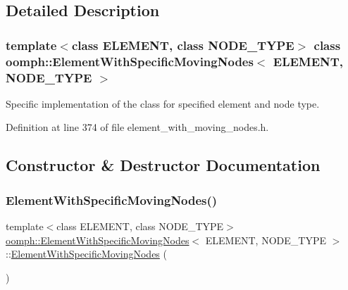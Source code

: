 \subsection{Detailed Description}
\subsubsection*{template$<$class E\+L\+E\+M\+E\+NT, class N\+O\+D\+E\+\_\+\+T\+Y\+PE$>$\newline
class oomph\+::\+Element\+With\+Specific\+Moving\+Nodes$<$ E\+L\+E\+M\+E\+N\+T, N\+O\+D\+E\+\_\+\+T\+Y\+P\+E $>$}

Specific implementation of the class for specified element and node type. 

Definition at line 374 of file element\+\_\+with\+\_\+moving\+\_\+nodes.\+h.



\subsection{Constructor \& Destructor Documentation}
\mbox{\label{classoomph_1_1ElementWithSpecificMovingNodes_ab1be9f676f0ba2b545da3573015cfe69}} 
\subsubsection{\texorpdfstring{Element\+With\+Specific\+Moving\+Nodes()}{ElementWithSpecificMovingNodes()}\hspace{0.1cm}{\footnotesize\ttfamily [1/2]}}
{\footnotesize\ttfamily template$<$class E\+L\+E\+M\+E\+NT, class N\+O\+D\+E\+\_\+\+T\+Y\+PE$>$ \\
\hyperlink{classoomph_1_1ElementWithSpecificMovingNodes}{oomph\+::\+Element\+With\+Specific\+Moving\+Nodes}$<$ E\+L\+E\+M\+E\+NT, N\+O\+D\+E\+\_\+\+T\+Y\+PE $>$\+::\hyperlink{classoomph_1_1ElementWithSpecificMovingNodes}{Element\+With\+Specific\+Moving\+Nodes} (\begin{DoxyParamCaption}{ }\end{DoxyParamCaption})\hspace{0.3cm}{\ttfamily [inline]}}



